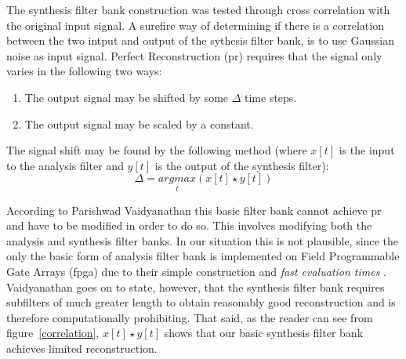 \documentclass[a4paper,10pt]{article}
\begin{document}
The synthesis filter bank construction was tested through cross correlation with the original input signal. A surefire way of determining if there is a 
correlation between the two intput and output of the sythesis filter bank, is to use Gaussian noise as input signal. Perfect Reconstruction (\gls{pr}) requires that the signal 
only varies in the following two ways:
\begin{enumerate}
 \item The output signal may be shifted by some $\Delta$ time steps.
 \item The output signal may be scaled by a constant.
\end{enumerate}

The signal shift may be found by the following method (where $x[t]$ is the input to the analysis filter and $y[t]$ is the output of the synthesis filter):
\begin{equation}
 \Delta=\underset{t}{argmax}(x[t]\star y[t])
\end{equation}

According to Parishwad Vaidyanathan \cite{vaidyanathan1990multirate} this basic filter bank cannot achieve \gls{pr} and have to be modified in order to do so. This involves 
modifying both the analysis and synthesis filter banks. In our situation this is not plausible, since the only the basic form of analysis filter bank is implemented 
on Field Programmable Gate Arrays (\gls{fpga}) due to their simple construction and \textit{fast evaluation times} \cite{vaidyanathan1990multirate}. Vaidyanathan goes on to state, 
however, that the synthesis filter bank requires subfilters of much greater length to obtain reasonably good reconstruction and is therefore computationally prohibiting. That 
said, as the reader can see from figure~\ref{correlation}, $x[t]\star y[t]$ shows that our basic synthesis filter bank achieves limited reconstruction.
\end{document}
